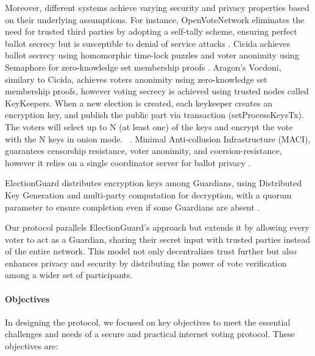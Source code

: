 \documentclass[runningheads]{llncs}
\begin{document}
Moreover, different systems achieve varying security and privacy properties based on their underlying assumptions. For instance, OpenVoteNetwork eliminates the need for trusted third parties by adopting a self-tally scheme, ensuring perfect ballot secrecy but is susceptible to denial of service attacks \cite{haoAnonymousVotingTworound2010, mccorrySmartContractBoardroom2017, seifelnasrScalableOpenVoteNetwork2020, elsheikhDisputefreeScalableOpen2022}. Cicida achieves ballot secrecy using homomorphic time-lock puzzles and voter anonimity using Semaphore for zero-knowledge set membership proofs \cite{BuildingCicadaPrivate, A16zCicada2023}. Aragon's Vocdoni, similary to Cicida, achieves voters anonimity using zero-knowledge set membership proofs, however voting secrecy is achieved using trusted nodes called KeyKeepers. When a new election is created, each keykeeper creates an encryption key, and publish the public part via transaction (setProcessKeysTx). The voters will select up to N (at least one) of the keys and encrypt the vote with the N keys in onion mode. ~\cite{williamsRemoteVotingAge2022, VocdoniIntroductionVocdoni}. Minimal Anti-collusion Infrastructure (MACI), guarantees censorship resistance, voter anonimity, and coersion-resistance, however it relies on a single coordinator server for ballot privacy \cite{ethereumfoundationMinimalAntiCollusionInfrastructure2022, PrivacyscalingexplorationsMaci2023}.

ElectionGuard distributes encryption keys among Guardians, using Distributed Key Generation and multi-party computation for decryption, with a quorum parameter to ensure completion even if some Guardians are absent \cite{ElectionGuard}.

Our protocol parallels ElectionGuard's approach but extends it by allowing every voter to act as a Guardian, sharing their secret input with trusted parties instead of the entire network. This model not only decentralizes trust further but also enhances privacy and security by distributing the power of vote verification among a wider set of participants.


\paragraph{Objectives}
In designing the protocol, we focused on key objectives to meet the essential challenges and needs of a secure and practical internet voting protocol. These objectives are:
\end{document}
